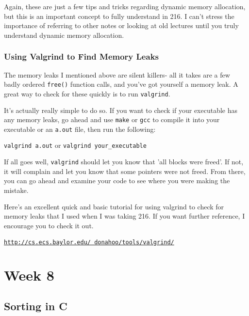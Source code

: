 \documentclass[english, 10pt]{article}
\begin{document}
Again, these are just a few tips and tricks regarding dynamic memory allocation, but this is an important concept to fully understand in 216. I can't stress the importance of referring to other notes or looking at old lectures until you truly understand dynamic memory allocation.\newline

\subsubsection{Using Valgrind to Find Memory Leaks}

The memory leaks I mentioned above are silent killers- all it takes are a few badly ordered \texttt{free()} function calls, and you've got yourself a memory leak. A great way to check for these quickly is to run \texttt{valgrind}.\newline

It's actually really simple to do so. If you want to check if your executable has any memory leaks, go ahead and use \texttt{make} or \texttt{gcc} to compile it into your executable or an \texttt{a.out} file, then run the following:\newline

\texttt{valgrind a.out} or \texttt{valgrind your\_executable}\newline

If all goes well, \texttt{valgrind} should let you know that 'all blocks were freed'. If not, it will complain and let you know that some pointers were not freed. From there, you can go ahead and examine your code to see where you were making the mistake.\newline

Here's an excellent quick and basic tutorial for using valgrind to check for memory leaks that I used when I was taking 216. If you want further reference, I encourage you to check it out.\newline

\texttt{\href{http://cs.ecs.baylor.edu/~donahoo/tools/valgrind/}{http://cs.ecs.baylor.edu/~donahoo/tools/valgrind/}}

\section{Week 8}

\subsection{Sorting in C}
\end{document}
